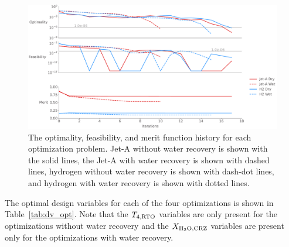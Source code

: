 \documentclass[conf]{new-aiaa}
\begin{document}
\begin{figure}[hbt!]
    \centering
    \includegraphics[width=1.0\textwidth]{opt_summary.pdf}
    \caption{The optimality, feasibility, and merit function history for each optimization problem.
        Jet-A without water recovery is shown with the solid lines, the Jet-A with water recovery is shown with dashed lines, hydrogen without water recovery is shown with dash-dot lines, and hydrogen with water recovery is shown with dotted lines.}
    \label{fig:history_summary}
\end{figure}

The optimal design variables for each of the four optimizations is shown in Table~\ref{tab:dv_opt}.
Note that the $T_{4,\rm{RTO}}$ variables are only present for the optimizations without water recovery and the $X_{\rm{{H_2O},CRZ}}$ variables are present only for the optimizations with water recovery.
\end{document}
